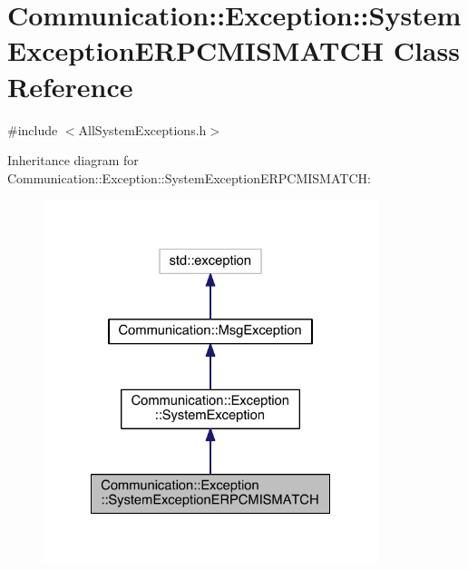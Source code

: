 \hypertarget{class_communication_1_1_exception_1_1_system_exception_e_r_p_c_m_i_s_m_a_t_c_h}{}\section{Communication\+:\+:Exception\+:\+:System\+Exception\+E\+R\+P\+C\+M\+I\+S\+M\+A\+T\+C\+H Class Reference}
\label{class_communication_1_1_exception_1_1_system_exception_e_r_p_c_m_i_s_m_a_t_c_h}


{\ttfamily \#include $<$All\+System\+Exceptions.\+h$>$}



Inheritance diagram for Communication\+:\+:Exception\+:\+:System\+Exception\+E\+R\+P\+C\+M\+I\+S\+M\+A\+T\+C\+H\+:\nopagebreak
\begin{figure}[H]
\begin{center}
\leavevmode
\includegraphics[width=276pt]{class_communication_1_1_exception_1_1_system_exception_e_r_p_c_m_i_s_m_a_t_c_h__inherit__graph}
\end{center}
\end{figure}


